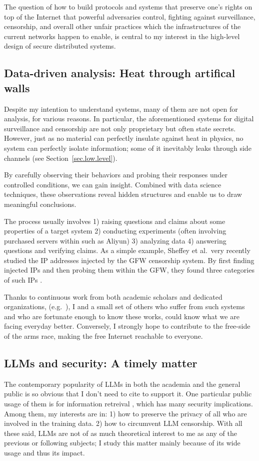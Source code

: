 \documentclass[10pt]{article}
\begin{document}
The question of how to build protocols and systems that preserve one's rights
on top of the Internet that powerful adversaries control, fighting against
surveillance, censorship, and overall other unfair practices which the
infrastructures of the current networks happen to enable, is central to my
interest in the high-level design of secure distributed systems.


\subsection[Data-driven analysis]{
Data-driven analysis: Heat through artifical walls}
Despite my intention to understand systems, many of them are not open for
analysis, for various reasons. In particular, the aforementioned systems for
digital surveillance and censorship are not only proprietary but often state
secrets. However, just as no material can perfectly insulate against heat in
physics, no system can perfectly isolate information; some of it inevitably
leaks through side channels (see Section~\ref{sec.low.level}). 

By carefully observing their behaviors and probing their responses under
controlled conditions, we can gain insight. Combined with data science
techniques, these observations reveal hidden structures and enable us to draw
meaningful conclusions.

The process usually involves 1) raising questions and claims about some
properties of a target system 2) conducting experiments (often involving
purchased servers within such as Aliyun) 3) analyzing data 4) answering
questions and verifying claims. As a simple example, Sheffey et al.\ very
recently studied the IP addresses injected by the GFW censorship system. By
first finding injected IPs and then probing them within the GFW, they found
three categories of such IPs \cite{gfw.injected.ip}. 

Thanks to continuous work from both academic scholars and dedicated
organizations, (e.g.\ \cite{data.analysis.1, data.analysis.2, censor.block.6}),
I and a small set of others who suffer from such systems and who are fortunate
enough to know these works, could know what we are facing everyday better.
Conversely, I strongly hope to contribute to the free-side of the arms race,
making the free Internet reachable to everyone.

\subsection[LLMs and security]{LLMs and security: A timely matter}
The contemporary popularity of LLMs in both the academia and the general public
is so obvious that I don't need to cite to support it. One particular public
usage of them is for information retreival \cite{info.ret.llms.1,
info.ret.llms.2}, which has many security
implications. Among them, my interests are in: 1) how to preserve the privacy
of all who are involved in the training data. 2) how to circumvent LLM
censorship. With all these said, LLMs are not of as much theoretical interest
to me as any of the previous or following subjects; I study this matter mainly
because of its wide usage and thus its impact.
\end{document}
